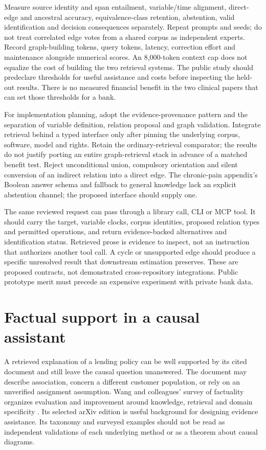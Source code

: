 Measure source identity and span entailment, variable/time alignment, direct-edge
and ancestral accuracy, equivalence-class retention, abstention, valid
identification and decision consequences separately. Repeat prompts and seeds;
do not treat correlated edge votes from a shared corpus as independent experts.
Record graph-building tokens, query tokens, latency, correction effort and
maintenance alongside numerical scores. An 8,000-token context cap does not
equalize the cost of building the two retrieval systems. The public study should
predeclare thresholds for useful assistance and costs before inspecting the
held-out results. There is no measured financial benefit in the two clinical
papers that can set those thresholds for a bank.

For implementation planning, adopt the evidence-provenance pattern and the
separation of variable definition, relation proposal and graph validation.
Integrate retrieval behind a typed interface only after pinning the underlying
corpus, software, model and rights. Retain the ordinary-retrieval comparator;
the results do not justify porting an entire graph-retrieval stack in advance
of a matched benefit test. Reject unconditional union, compulsory orientation
and silent conversion of an indirect relation into a direct edge. The chronic-pain
appendix's Boolean answer schema and fallback to general knowledge lack an
explicit abstention channel; the proposed interface should supply one.
\citep{exec22_domain_lin}

The same reviewed request can pass through a library call, CLI or MCP tool. It
should carry the target, variable clocks, corpus identities, proposed relation
types and permitted operations, and return evidence-backed alternatives and
identification status. Retrieved prose is evidence to inspect, not an instruction
that authorizes another tool call. A cycle or unsupported edge should produce a
specific unresolved result that downstream estimation preserves. These are
proposed contracts, not demonstrated cross-repository integrations. Public
prototype merit must precede an expensive experiment with private bank data.


\section{Factual support in a causal assistant}
\label{exec22:fact-scope}

A retrieved explanation of a lending policy can be well supported by its cited
document and still leave the causal question unanswered. The document may
describe association, concern a different customer population, or rely on an
unverified assignment assumption. Wang and colleagues' survey of factuality
organizes evaluation and improvement around knowledge, retrieval and domain
specificity \citep{exec22_factuality_wang}. Its selected arXiv edition is useful
background for designing evidence assistance. Its taxonomy and surveyed
examples should not be read as independent validations of each underlying
method or as a theorem about causal diagrams.

